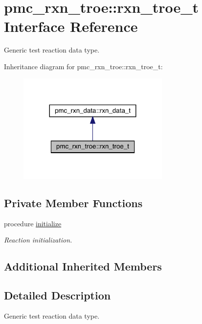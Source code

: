 \hypertarget{structpmc__rxn__troe_1_1rxn__troe__t}{}\section{pmc\+\_\+rxn\+\_\+troe\+:\+:rxn\+\_\+troe\+\_\+t Interface Reference}
\label{structpmc__rxn__troe_1_1rxn__troe__t}


Generic test reaction data type.  




Inheritance diagram for pmc\+\_\+rxn\+\_\+troe\+:\+:rxn\+\_\+troe\+\_\+t\+:\nopagebreak
\begin{figure}[H]
\begin{center}
\leavevmode
\includegraphics[width=212pt]{structpmc__rxn__troe_1_1rxn__troe__t__inherit__graph}
\end{center}
\end{figure}
\subsection*{Private Member Functions}
\begin{DoxyCompactItemize}
\item 
procedure \mbox{\hyperlink{structpmc__rxn__troe_1_1rxn__troe__t_abaf1df0720e6e47f0a29c2aab399f137}{initialize}}
\begin{DoxyCompactList}\small\item\em Reaction initialization. \end{DoxyCompactList}\end{DoxyCompactItemize}
\subsection*{Additional Inherited Members}


\subsection{Detailed Description}
Generic test reaction data type. 

